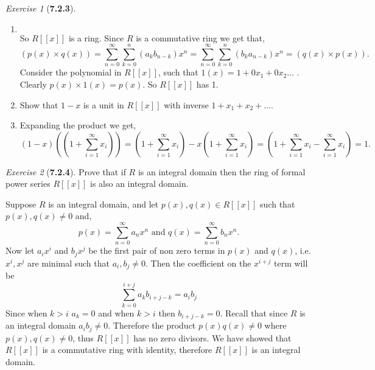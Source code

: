 \documentclass[12pt]{amsart}
\makeatletter
\theoremstyle{remark}
\newtheorem*{exercise}{Exercise}%
\renewenvironment{proof}[1][\proofname]{\par\doublespacing
  \pushQED{\qed}%
  \normalfont \topsep6\p@\@plus6\p@\relax
  \list{}{%
    \settowidth{\leftmargin}{\itshape\proofname:\hskip\labelsep}%
    \setlength{\labelwidth}{0pt}%
    \setlength{\itemindent}{-\leftmargin}%
  }%
  \item[\hskip\labelsep\itshape#1\@addpunct{:}]\ignorespaces
}{%
  \popQED\endlist\@endpefalse
  \singlespacing
}
\theoremstyle{mycomment}
\makeatother
\begin{document}
\begin{exercise}[\textbf{7.2.3}]
\begin{enumerate}
\begin{proof}
\begin{equation*}
      \end{equation*}
      So $R[[x]]$ is a ring. Since $R$ is a commutative ring we get that, 
      \begin{equation*}
        (p(x) \times q(x)) = \sum_{n = 0}^{\infty}\sum_{k = 0}^{n}(a_kb_{n - k})x^n =  \sum_{n = 0}^{\infty}\sum_{k = 0}^{n}(b_ka_{n - k})x^n =  (q(x) \times p(x)).
      \end{equation*}
      Consider the polynomial in $R[[x]]$, such that $1(x) = 1 + 0x_1 + 0x_2 \dots$ . Clearly $p(x) \times 1(x) = p(x)$. So $R[[x]]$ has 1. 
    \end{proof}
\vspace{.15in}


    \item[b] Show that $1 - x$ is a unit in $R[[x]]$ with inverse $1 + x_1 + x_2 + \dots$. 
    \begin{proof} Expanding the product we get, 
      \begin{equation*}
        (1 - x)((1 + \sum_{i = 1}^{\infty}x_i)) = (1 + \sum_{i = 1}^{\infty}x_i) - x(1 + \sum_{i = 1}^{\infty}x_i) = (1 + \sum_{i = 1}^{\infty}x_i -  \sum_{i = 1}^{\infty}x_i) = 1. 
      \end{equation*}
    \end{proof}
\vspace{.15in}
  \end{enumerate}


  
\end{exercise}
\vspace{.15in}




\begin{exercise}[\textbf{7.2.4}] Prove that if $R$ is an integral domain then the ring of formal power series $R[[x]]$ is 
  also an integral domain. 
  \begin{proof}Suppose $R$ is an integral domain, and let $p(x), q(x) \in R[[x]]$ such that $p(x),q(x) \neq 0$ and, 
    \begin{equation*}
      p(x) = \sum_{n = 0}^{\infty}a_nx^n \text{  and  }q(x) = \sum_{n = 0}^{\infty}b_nx^n.
    \end{equation*}
    Now let $a_ix^i$ and $b_jx^j$ be the first pair of non zero terms in $p(x)$ and $q(x)$, i.e. $x^i, x^j$ are minimal such that $a_i, b_j \neq 0$.
    Then the coefficient on the $x^{i + j}$ term will be 
    \begin{equation*}
      \sum_{k = 0}^{i + j} a_k b_{i + j - k} = a_ib_j
    \end{equation*}
    Since when $k > i$ $a_k = 0$ and when $k > i$ then $b_{i + j - k} = 0$. Recall that since $R$ is an integral domain $a_ib_j \neq 0$. Therefore the product $p(x)q(x) \neq 0$ where $p(x),q(x) \neq 0$, thus $R[[x]]$ has no zero divisors. We have showed that $R[[x]]$ is a commutative ring with identity, therefore $R[[x]]$ is an integral domain. 
    \end{proof}
\end{exercise}
\vspace{.15in}
\end{document}
